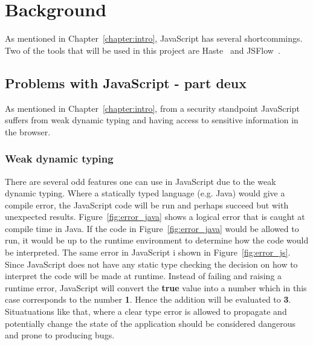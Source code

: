 \chapter{Background}
As mentioned in Chapter~\ref{chapter:intro}, JavaScript has several shortcommings. Two of the tools that will be used in this project are Haste~\cite{haste-lang} and JSFlow~\cite{jsflow,jsflow-csf12,jsflow-sac14}.
\section{Problems with JavaScript - part deux}
As mentioned in Chapter~\ref{chapter:intro}, from a security standpoint JavaScript suffers from weak dynamic typing and having access to sensitive information in the browser.
\subsection{Weak dynamic typing}
There are several odd features one can use in JavaScript due to the weak dynamic typing. Where a statically typed language (e.g. Java) would give a compile error, the JavaScript code will be run and perhaps succeed but with unexpected results. Figure~\ref{fig:error_java} shows a logical error that is caught at compile time in Java. If the code in Figure~\ref{fig:error_java} would be allowed to run, it would be up to the runtime environment to determine how the code would be interpreted. The same error in JavaScript i shown in Figure~\ref{fig:error_js}. Since JavaScript does not have any static type checking the decision on how to interpret the code will be made at runtime. Instead of failing and raising a runtime error, JavaScript will convert the \textbf{true} value into a number which in this case corresponds to the number \textbf{1}. Hence the addition will be evaluated to \textbf{3}. Situatuations like that, where a clear type error is allowed to propagate and potentially change the state of the application should be considered dangerous and prone to producing bugs.


